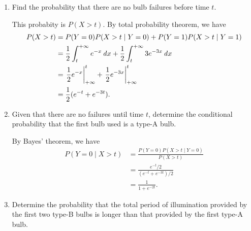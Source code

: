 \begin{enumerate}
\begin{enumerate}
  \item Find the probability that there are no bulb failures before
    time \(t\).

    This probabity is \(P(X > t)\).  By total probability theorem, we
    have
    \begin{align*}
      P(X > t) &= P(Y=0) P(X > t \mid Y=0) + P(Y=1) P(X > t \mid Y=1) \\
               &= \frac12  \int_t^{+\infty} e^{-x} \mathop{}\!\mathit{d} x + \frac12 \int_t^{+\infty} 3e^{-3x} \mathop{}\!\mathit{d} x \\
               &= \left.\frac12 e^{-x}\right\vert_{+\infty}^t + \left.\frac12 e^{-3x}\right\vert_{+\infty}^t \\
               &= \frac12 (e^{-t} + e^{-3t}).
    \end{align*}

  \item Given that there are no failures until time \(t\), determine
    the conditional probability that the first bulb used is a type-A
    bulb.

    By Bayes' theorem, we have
    \begin{align*}
      P(Y=0 \mid X > t) &= \frac{P(Y=0) P(X > t \mid Y=0)}{P(X > t)} \\
                        &= \frac{e^{-t}/2}{(e^{-t} + e^{-3t})/2} \\
                        &= \frac1{1+e^{-2t}}.
    \end{align*}

  \item Determine the probability that the total period of
    illumination provided by the first two type-B bulbs is longer than
    that provided by the first type-A bulb.


\end{enumerate}
\end{enumerate}
